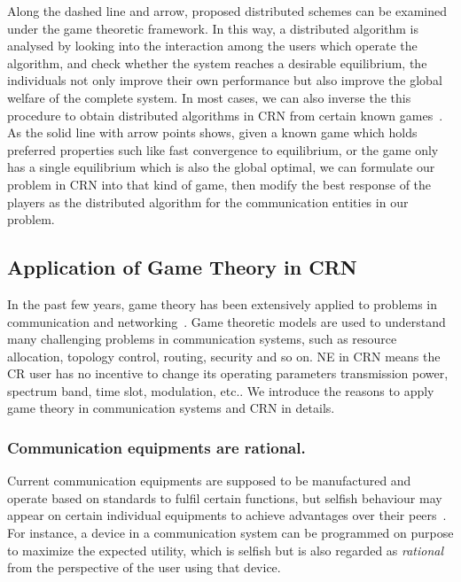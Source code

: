 Along the dashed line and arrow, proposed distributed schemes can be examined under the game theoretic framework.
In this way, a distributed algorithm is analysed by looking into the interaction among the users which operate the algorithm, and check whether the system reaches a desirable equilibrium, \ie the individuals not only improve their own performance but also improve the global welfare of the complete system.
In most cases, we can also inverse the this procedure to obtain distributed algorithms in CRN from certain known games~\cite{altman_Smodel_pc_2003}.
As the solid line with arrow points shows, given a known game which holds preferred properties such like fast convergence to equilibrium, or the game only has a single equilibrium which is also the global optimal, we can formulate our problem in CRN into that kind of game, then modify the best response of the players as the distributed algorithm for the communication entities in our problem. 



\subsection{Application of Game Theory in CRN}

In the past few years, game theory has been extensively applied to problems in communication and networking~\cite{Neel06analysisand, Wang_gtc_crn_survey_2010}.
Game theoretic models are used to understand many challenging problems in communication systems, such as resource allocation, topology control, routing, security and so on. 
NE in CRN means the CR user has no incentive to change its operating parameters \eg transmission power, spectrum band, time slot, modulation, etc.. 
We introduce the reasons to apply game theory in communication systems and CRN in details.

\subsubsection{Communication equipments are rational.}
Current communication equipments are supposed to be manufactured and operate based on standards to fulfil certain functions, but selfish behaviour may appear on certain individual equipments to achieve advantages over their peers~\cite{game_for_communication_01}.
For instance, a device in a communication system can be programmed on purpose to maximize the expected utility, which is selfish but is also regarded as \textit{rational} from the perspective of the user using that device.

